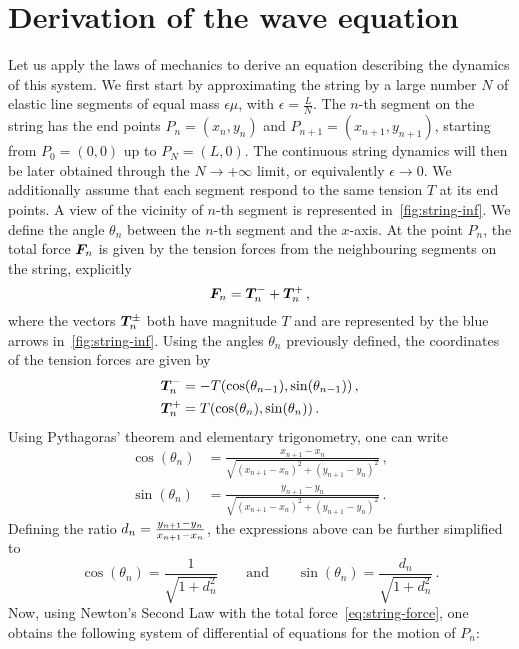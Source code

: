 \section{Derivation of the wave equation}
Let us apply the laws of mechanics to derive an equation describing the dynamics of this
system. We first start by approximating the string by a large number $N$ of elastic line
segments of equal mass $\epsilon\mu$, with $\epsilon=\frac{L}{N}$. The $n$-th segment on
the string has the end points $P_n=(x_n,y_n)$ and $P_{n+1}=(x_{n+1},y_{n+1})$, starting
from $P_0=(0,0)$ up to $P_N=(L,0)$. The continuous string dynamics will then be later
obtained through the $N\to+\infty$ limit, or equivalently $\epsilon\to 0$. We additionally
assume that each segment respond to the same tension $T$ at its end points. A view of the
vicinity of $n$-th segment is represented in~\cref{fig:string-inf}. We define the angle
$\theta_n$ between the $n$-th segment and the $x$-axis. At the point $P_n$, the total
force $\bm{F}_n$ is given by the tension forces from the neighbouring segments on the
string, explicitly
\begin{equation}
  \bm{F}_n=\bm{T}_n^-+\bm{T}_n^+\,,\label{eq:string-force}
\end{equation}
where the vectors $\bm{T}_n^\pm$ both have magnitude $T$ and are represented by the
blue arrows in~\cref{fig:string-inf}. Using the angles $\theta_n$ previously defined, the
coordinates of the tension forces are given by
\begin{align}
  \bm{T}_n^-&=-T(\cos(\theta_{n-1}),\sin(\theta_{n-1}))\,,\\
  \bm{T}_n^+&=T(\cos(\theta_{n}),\sin(\theta_{n}))\,.
\end{align}
Using Pythagoras' theorem and elementary trigonometry, one can write
\begin{align}
  \cos(\theta_n)&=\frac{x_{n+1}-x_n}{\sqrt{(x_{n+1}-x_n)^2+(y_{n+1}-y_n)^2}}\,,\\
  \sin(\theta_n)&=\frac{y_{n+1}-y_n}{\sqrt{(x_{n+1}-x_n)^2+(y_{n+1}-y_n)^2}}\,.
\end{align}
Defining the ratio $d_n=\smash{\frac{y_{n+1}-y_n}{x_{n+1}-x_n}}$, the expressions above
can be further simplified to
\begin{equation}
  \cos(\theta_n)=\frac{1}{\sqrt{1+d_n^2}}\qquad\text{and}\qquad
  \sin(\theta_n)=\frac{d_n}{\sqrt{1+d_n^2}}\,.
\end{equation}
Now, using Newton's Second Law with the total force~\cref{eq:string-force}, one obtains
the following system of differential of equations for the motion of $P_n$:
